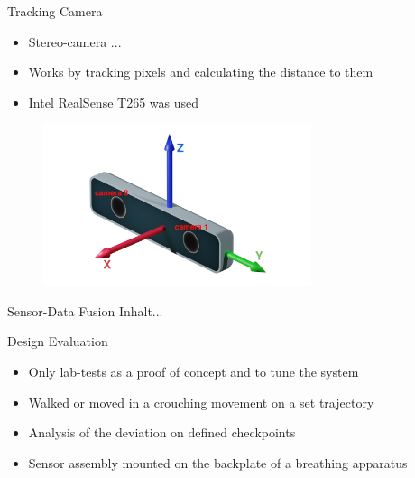 \documentclass[aspectratio=1609]{beamer}
\begin{document}
	\begin{frame}{Tracking Camera}
		\begin{itemize}
			\item Stereo-camera ...
			\item Works by tracking pixels and calculating the distance to them
			\item Intel RealSense T265 was used
		\end{itemize}
		\begin{figure}
			\centering
			\includegraphics[width=0.7\textwidth]{../Conference_Paper/realsense.png}
		\end{figure}
	\end{frame}
	
	\begin{frame}{Sensor-Data Fusion}
		Inhalt...
	\end{frame}
	
	\begin{frame}{Design Evaluation}
		\begin{itemize}
			\item Only lab-tests as a proof of concept and to tune the system
			\item Walked or moved in a crouching movement on a set trajectory
			\item Analysis of the deviation on defined checkpoints
			\item Sensor assembly mounted on the backplate of a breathing apparatus
		\end{itemize}
		
	\end{frame}
	
\end{document}
